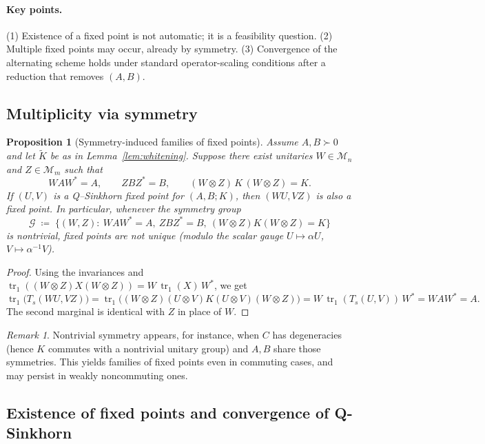 \documentclass[10pt]{article}
\newcommand{\Mm}{\mathcal{M}}
\newcommand{\tr}{\operatorname{tr}}
\newcommand{\eqdef}{\coloneqq}
\theoremstyle{plain}
\newtheorem{prop}{Proposition}
\theoremstyle{definition}
\theoremstyle{remark}
\newtheorem{rem}{Remark}
\begin{document}
\paragraph{Key points.}
(1) Existence of a fixed point is not automatic; it is a feasibility question.  
(2) Multiple fixed points may occur, already by symmetry.  
(3) Convergence of the alternating scheme holds under standard operator-scaling conditions after a reduction that removes $(A,B)$.


\subsection{Multiplicity via symmetry}

\begin{prop}[Symmetry-induced families of fixed points]
\label{prop:symmetry-multiplicity}
Assume $A,B\succ0$ and let $\widetilde{K}$ be as in Lemma~\ref{lem:whitening}. Suppose there exist unitaries $W\in \Mm_n$ and $Z\in \Mm_m$ such that
\[
WAW^\ast=A,\qquad ZBZ^\ast=B,\qquad (W\otimes Z)\,K\,(W\otimes Z)=K.
\]
If $(U,V)$ is a Q--Sinkhorn fixed point for $(A,B;K)$, then $(WU,VZ)$ is also a fixed point.  
In particular, whenever the symmetry group
\[
\mathcal{G}\;\eqdef\;\Big\{(W,Z):\ WAW^\ast=A,\ ZBZ^\ast=B,\ (W\otimes Z)K(W\otimes Z)=K\Big\}
\]
is nontrivial, fixed points are not unique (modulo the scalar gauge $U\mapsto \alpha U$, $V\mapsto \alpha^{-1}V$).
\end{prop}

\begin{proof}
Using the invariances and $\tr_1((W\otimes Z)X(W\otimes Z))=W\,\tr_1(X)\,W^\ast$, we get
\[
\tr_1\!\big(T_s(WU,VZ)\big)
=\tr_1\!\big((W\otimes Z)(U\otimes V)K(U\otimes V)(W\otimes Z)\big)
=W\,\tr_1(T_s(U,V))\,W^\ast
=WAW^\ast=A.
\]
The second marginal is identical with $Z$ in place of $W$.
\end{proof}

\begin{rem}
Nontrivial symmetry appears, for instance, when $C$ has degeneracies (hence $K$ commutes with a nontrivial unitary group) and $A,B$ share those symmetries. This yields families of fixed points even in commuting cases, and may persist in weakly noncommuting ones.
\end{rem}

\subsection{Existence of fixed points and convergence of Q-Sinkhorn}
\label{sec:exist-conv-targeted}
\end{document}
